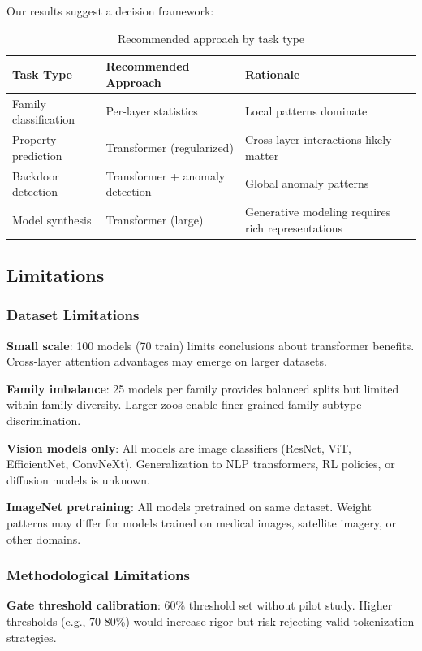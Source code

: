 Our results suggest a decision framework:

\begin{table}[h]
\centering
\caption{Recommended approach by task type}
\begin{tabular}{lll}
\hline
\textbf{Task Type} & \textbf{Recommended Approach} & \textbf{Rationale} \\
\hline
Family classification & Per-layer statistics & Local patterns dominate \\
Property prediction & Transformer (regularized) & Cross-layer interactions likely matter \\
Backdoor detection & Transformer + anomaly detection & Global anomaly patterns \\
Model synthesis & Transformer (large) & Generative modeling requires rich representations \\
\hline
\end{tabular}
\end{table}

\subsection{Limitations}

\subsubsection{Dataset Limitations}

\textbf{Small scale}: 100 models (70 train) limits conclusions about transformer benefits. Cross-layer attention advantages may emerge on larger datasets.

\textbf{Family imbalance}: 25 models per family provides balanced splits but limited within-family diversity. Larger zoos enable finer-grained family subtype discrimination.

\textbf{Vision models only}: All models are image classifiers (ResNet, ViT, EfficientNet, ConvNeXt). Generalization to NLP transformers, RL policies, or diffusion models is unknown.

\textbf{ImageNet pretraining}: All models pretrained on same dataset. Weight patterns may differ for models trained on medical images, satellite imagery, or other domains.

\subsubsection{Methodological Limitations}

\textbf{Gate threshold calibration}: 60\% threshold set without pilot study. Higher thresholds (e.g., 70-80\%) would increase rigor but risk rejecting valid tokenization strategies.

